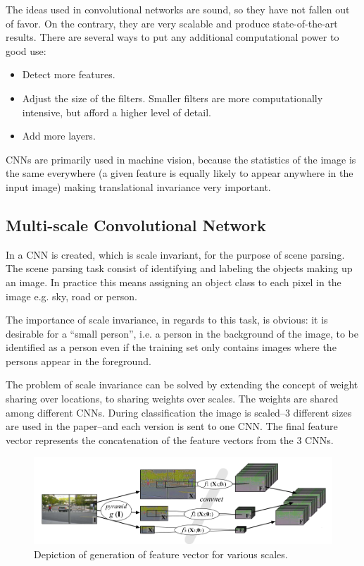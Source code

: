 \documentclass[11pt]{article}
\begin{document}
The ideas used in convolutional networks are sound, so they have not fallen out of favor.  On the contrary, they are very scalable and produce state-of-the-art results.  There are several ways to put any additional computational power to good use:
\begin{itemize}
\item Detect more features.
\item Adjust the size of the filters.  Smaller filters are more computationally intensive, but afford a higher level of detail.
\item Add more layers.
\end{itemize}

CNNs are primarily used in machine vision, because the statistics of the image is the same everywhere (a given feature is equally likely to appear anywhere in the input image) making translational invariance very important.

\subsection{Multi-scale Convolutional Network}

In \cite{farabet} a CNN is created, which is scale invariant, for the purpose of scene parsing.  The scene parsing task consist of identifying and labeling the objects making up an image.  In practice this means assigning an object class to each pixel in the image e.g. sky, road or person.

The importance of scale invariance, in regards to this task, is obvious: it is desirable for a ``small person'', i.e. a person in the background of the image, to be identified as a person even if the training set only contains images where the persons appear in the foreground.

The problem of scale invariance can be solved by extending the concept of weight sharing over locations, to sharing weights over scales.  The weights are shared among different CNNs.  During classification the image is scaled--3 different sizes are used in the paper--and each version is sent to one CNN.  The final feature vector represents the concatenation of the feature vectors from the 3 CNNs.

\begin{figure}[htb]
  \centering
  \includegraphics[width=\textwidth]{mymscnn.png}
  \caption{Depiction of generation of feature vector for various scales.}
  \label{fig:mscn}
\end{figure}
\end{document}
